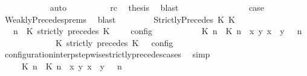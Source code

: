 \begin{isabellebody}
\ \ \ \ \ \ \ \ \ \ \isamarkupfalse%
\ auto\isanewline
\ \ \ \ \ \ \ \ \isamarkupfalse%
\ rc\ \isamarkupfalse%
\ {\isacharquery}thesis\ \isamarkupfalse%
\ blast\isanewline
\ \ \ \ \ \ \isamarkupfalse%
\isanewline
\ \ \ \ \ \ \isamarkupfalse%
\ \isamarkupfalse%
\ {\isacharquery}case\ \isamarkupfalse%
\ WeaklyPrecedes{\isachardot}prems{\isacharparenleft}{}{\isacharparenright}\ \isamarkupfalse%
\ blast\isanewline
\ \ \isamarkupfalse%
\isanewline
\ \ \ \ \isamarkupfalse%
\ {\isacharparenleft}StrictlyPrecedes\ K\ K\isanewline
\ \ \ \ \ \ \isamarkupfalse%
\ {\isacartoucheopen}{\isasymlbrakk}\ {\isasymGamma}{\isacharcomma}\ n\ {\isasymturnstile}\ {\isacharparenleft}{\isacharparenleft}K\ strictly\ precedes\ K\ {\isacharhash}\ {\isasymPsi}{\isacharparenright}\ {\isasymtriangleright}\ {\isasymPhi}\ {\isasymrbrakk}\isactrlsub c\isactrlsub o\isactrlsub n\isactrlsub f\isactrlsub i\isactrlsub g\ {\isacharequal}\isanewline
\ \ \ \ \ \ \ \ {\isasymlbrakk}\ {\isacharparenleft}{\isacharparenleft}{\isasymlceil}{\isacharhash}\isactrlsup {\isasymle}\ K\ n{\isacharcomma}\ {\isacharhash}\isactrlsup {\isacharless}\ K\ n{\isasymrceil}\ {\isasymin}\ {\isacharparenleft}{\isasymlambda}{\isacharparenleft}x{\isacharcomma}\ y{\isacharparenright}{\isachardot}\ x\ {\isasymle}\ y{\isacharparenright}{\isacharparenright}\ {\isacharhash}\ {\isasymGamma}{\isacharparenright}{\isacharcomma}\ n\isanewline
\ \ \ \ \ \ \ \ \ \ {\isasymturnstile}\ {\isasymPsi}\ {\isasymtriangleright}\ {\isacharparenleft}{\isacharparenleft}K\ strictly\ precedes\ K\ {\isacharhash}\ {\isasymPhi}{\isacharparenright}\ {\isasymrbrakk}\isactrlsub c\isactrlsub o\isactrlsub n\isactrlsub f\isactrlsub i\isactrlsub g{\isacartoucheclose}\isanewline
\ \ \ \ \ \ \ \ \isamarkupfalse%
\ configuration{\isacharunderscore}interp{\isacharunderscore}stepwise{\isacharunderscore}strictly{\isacharunderscore}precedes{\isacharunderscore}cases\ \isamarkupfalse%
\ simp\isanewline
\ \ \ \ \ \ \isamarkupfalse%
\ \isamarkupfalse%
\ {\isacartoucheopen}{\isasymrho}\ {\isasymin}\ {\isasymlbrakk}\ {\isacharparenleft}{\isacharparenleft}{\isasymlceil}{\isacharhash}\isactrlsup {\isasymle}\ K\ n{\isacharcomma}\ {\isacharhash}\isactrlsup {\isacharless}\ K\ n{\isasymrceil}\ {\isasymin}\ {\isacharparenleft}{\isasymlambda}{\isacharparenleft}x{\isacharcomma}\ y{\isacharparenright}{\isachardot}\ x\ {\isasymle}\ y{\isacharparenright}{\isacharparenright}\ {\isacharhash}\ {\isasymGamma}{\isacharparenright}{\isacharcomma}\ n\isanewline

\end{isabellebody}
